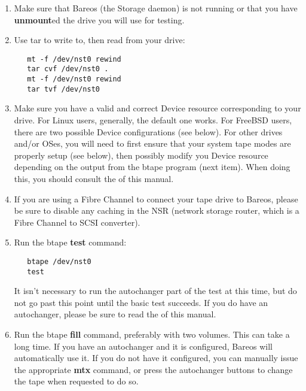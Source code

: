 \begin{enumerate}
\item Make sure that Bareos (the Storage daemon) is not running
  or that you have {\bf unmount}ed the drive you will use
  for testing.

\item Use tar to write to, then read from your drive:

   \footnotesize
\begin{verbatim}
   mt -f /dev/nst0 rewind
   tar cvf /dev/nst0 .
   mt -f /dev/nst0 rewind
   tar tvf /dev/nst0

\end{verbatim}
\normalsize

\item Make sure you have a valid and correct Device resource corresponding
   to your drive.  For Linux users, generally, the default one works.  For
   FreeBSD users, there are two possible Device configurations (see below).
   For other drives and/or OSes, you will need to first ensure that your
   system tape modes are properly setup (see below), then possibly modify
   you Device resource depending on the output from the btape program (next
   item). When doing this, you should consult the  of this manual.

\item If you are using a Fibre Channel to connect your tape drive to
   Bareos, please be sure to disable any caching in the NSR (network
   storage router, which is a Fibre Channel to SCSI converter).

\item Run the btape {\bf test} command:

   \footnotesize
\begin{verbatim}
   btape /dev/nst0
   test
\end{verbatim}
\normalsize

   It isn't necessary to run the autochanger part of the test at this time,
   but do not go past this point until the basic test succeeds.  If you do
   have an autochanger, please be sure to read the  of this manual.

\item Run the btape {\bf fill} command, preferably with two volumes.  This
   can take a long time. If you have an autochanger and it  is configured, Bareos
   will automatically use it. If you do  not have it configured, you can manually
   issue the appropriate  {\bf mtx} command, or press the autochanger buttons to
   change  the tape when requested to do so.


\end{enumerate}
